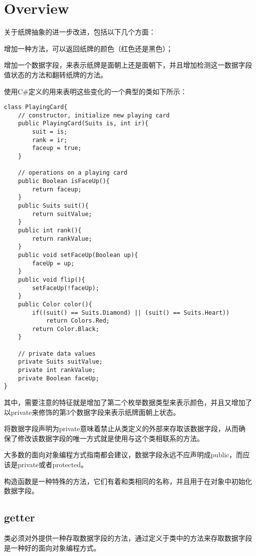 \section{Overview}


关于纸牌抽象的进一步改进，包括以下几个方面：

\begin{compactitem}
\item 增加一种方法，可以返回纸牌的颜色（红色还是黑色）；
\item 增加一个数据字段，来表示纸牌是面朝上还是面朝下，并且增加检测这一数据字段值状态的方法和翻转纸牌的方法。
\end{compactitem}


使用C\#定义的用来表明这些变化的一个典型的类如下所示：

\begin{lstlisting}[language={[Sharp]C}]
class PlayingCard{
	// constructor, initialize new playing card
	public PlayingCard(Suits is, int ir){
		suit = is;
		rank = ir;
		faceup = true;
	}
	
	// operations on a playing card
	public Boolean isFaceUp(){
		return faceup;
	}
	public Suits suit(){
		return suitValue;
	}
	public int rank(){
		return rankValue;
	}
	public void setFaceUp(Boolean up){
		faceUp = up;
	}
	public void flip(){
		setFaceUp(!faceUp);
	}
	public Color color(){
		if((suit() == Suits.Diamond) || (suit() == Suits.Heart))
			return Colors.Red;
		return Color.Black;
	}
	
	// private data values
	private Suits suitValue;
	private int rankValue;
	private Boolean faceUp;
}
\end{lstlisting}



其中，需要注意的特征就是增加了第二个枚举数据类型来表示颜色，并且又增加了以private来修饰的第3个数据字段来表示纸牌面朝上状态。

将数据字段声明为private意味着禁止从类定义的外部来存取该数据字段，从而确保了修改该数据字段的唯一方式就是使用与这个类相联系的方法。

大多数的面向对象编程方式指南都会建议，数据字段永远不应声明成public，而应该是private或者protected。

构造函数是一种特殊的方法，它们有着和类相同的名称，并且用于在对象中初始化数据字段。

\subsection{getter}


类必须对外提供一种存取数据字段的方法，通过定义于类中的方法来存取数据字段是一种好的面向对象编程方式。

